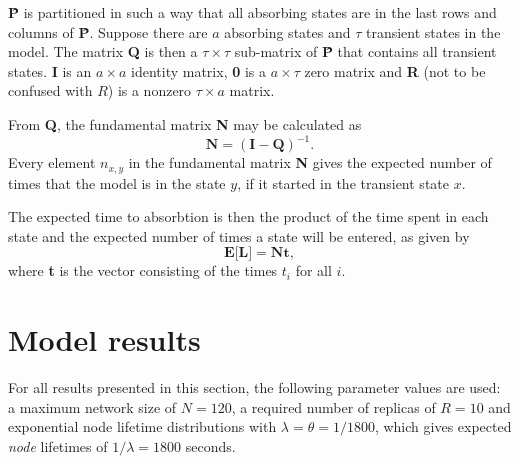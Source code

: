 \textbf{\^{P}} is partitioned in such a way that all absorbing states are in the last rows and columns of \textbf{\^{P}}. Suppose there are $a$ absorbing states and $\tau$ transient states in the model. The matrix \textbf{Q} is then a $\tau\times\tau$ sub-matrix of \textbf{\^{P}} that contains all transient states. \textbf{I} is an $a \times a$ identity matrix, \textbf{0} is a $a\times\tau$ zero matrix and \textbf{R} (not to be confused with $R$) is a nonzero $\tau\times a$ matrix.

From \textbf{Q}, the fundamental matrix \textbf{N} may be calculated as \cite{grinstead1997introduction_probability}
%
\begin{equation} \label{eq_fundamental_mat}
    \textbf{N} = (\textbf{I} - \textbf{Q})^{-1}.
\end{equation}
%
Every element $n_{x,y}$ in the fundamental matrix \textbf{N} gives the expected number of times that the model is in the state $y$, if it started in the transient state $x$.

The expected time to absorbtion is then the product of the time spent in each state and the expected number of times a state will be entered, as given by
%
\begin{equation} \label{expected_lifetime}
    \textbf{E[L]} = \textbf{Nt},
\end{equation}
%
where \textbf{t} is the vector consisting of the times $t_i$ for all $i$.

\section{Model results}
\label{results}

For all results presented in this section, the following parameter values are used: a maximum network size of $N=120$, a required number of replicas of $R = 10$ and exponential node lifetime distributions with $\lambda = \theta = 1/1800$, which gives expected \emph{node} lifetimes of $1/\lambda = 1800$ seconds.


